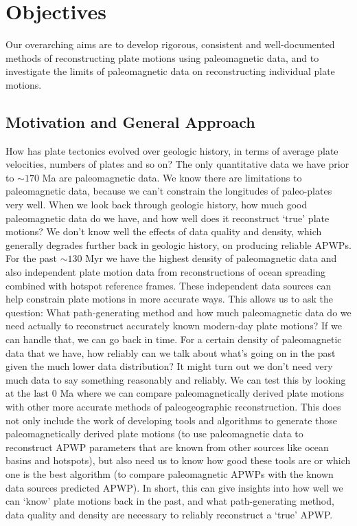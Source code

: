 \section{Objectives}

Our overarching aims are to develop rigorous, consistent and well-documented
methods of reconstructing plate motions using paleomagnetic data, and to
investigate the limits of paleomagnetic data on reconstructing individual plate
motions.

\subsection{Motivation and General Approach}

How has plate tectonics evolved over geologic history, in terms of average plate
velocities, numbers of plates and so on? The only quantitative data we have
prior to ${\sim}170$ Ma are paleomagnetic data. We know there are limitations to
paleomagnetic data, because we can't constrain the longitudes of paleo-plates
very well. When we look back through geologic history, how much good
paleomagnetic data do we have, and how well does it reconstruct `true' plate
motions? We don't know well the effects of data quality and density, which
generally degrades further back in geologic history, on producing reliable
APWPs. For the past ${\sim}130$ Myr we have the highest density of
paleomagnetic data and also independent plate motion data from reconstructions
of ocean spreading combined with hotspot reference frames. These independent
data sources can help constrain plate motions in more accurate ways. This allows
us to ask the question: What path-generating method and how much paleomagnetic
data do we need actually to reconstruct accurately known modern-day plate
motions? If we can handle that, we can go back in time. For a certain density of
paleomagnetic data that we have, how reliably can we talk about what's going on
in the past given the much lower data distribution? It might turn out we don't
need very much data to say something reasonably and reliably. We can test this
by looking at the last 0 Ma where we can compare paleomagnetically
derived plate motions with other more accurate methods of paleogeographic
reconstruction. This does not only include the work of developing tools and
algorithms to generate those paleomagnetically derived plate motions (to use
paleomagnetic data to reconstruct APWP parameters that are known from other
sources like ocean basins and hotspots), but also need us to know how good these
tools are or which one is the best algorithm (to compare paleomagnetic APWPs
with the known data sources predicted APWP). In short, this can give insights
into how well we can `know' plate motions back in the past, and what
path-generating method, data quality and density are necessary to reliably
reconstruct a `true' APWP\@.

